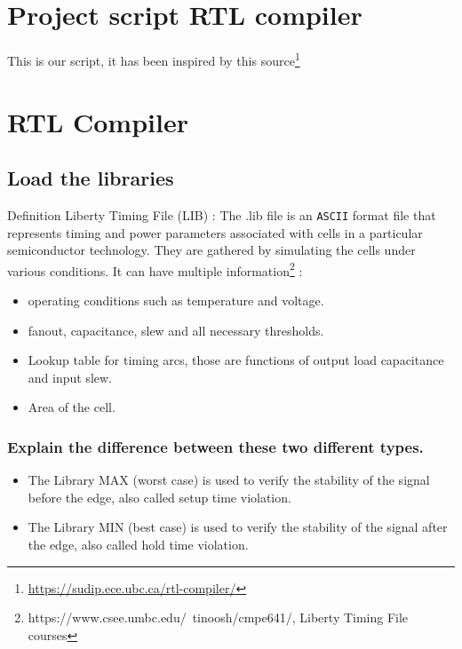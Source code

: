 \documentclass[11pt,a4paper,sans,dvipsnames]{report}
\begin{document}
\newpage
\tableofcontents
\vspace*{3cm}
\begingroup\let\clearpage\relax

	\newpage
	\chapter{Project script RTL compiler}
	This is our script, it has been inspired by this source\footnote{\url{https://sudip.ece.ubc.ca/rtl-compiler/}}
	





	\newpage
	\chapter{RTL Compiler}


	\section{Load the libraries}

	Definition Liberty Timing File (LIB) : The .lib file is an \texttt{ASCII} format file that represents timing and power parameters associated with cells in a particular semiconductor technology. They are gathered by simulating the cells under various conditions. It can have multiple information\footnote{https://www.csee.umbc.edu/~tinoosh/cmpe641/, Liberty Timing File courses} :

	\begin{itemize}
		\item operating conditions such as temperature and voltage.
		\item fanout, capacitance, slew and all necessary thresholds.
		\item Lookup table for timing arcs, those are functions of output load capacitance and input slew.
		\item Area of the cell.
	\end{itemize}

	\subsection*{Explain the difference between these two different types.}
	\begin{itemize}
		\item The Library MAX (worst case) is used to verify the stability of the signal before the edge, also called setup time violation.
		\item The Library MIN (best case) is used to verify the stability of the signal after the edge, also called hold time violation.
	\end{itemize}
\end{document}
